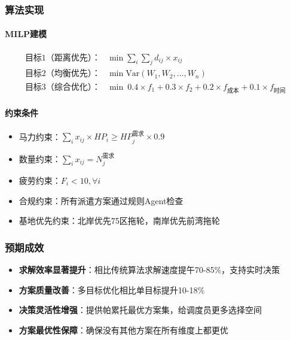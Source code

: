 \documentclass[12pt,a4paper]{article}
\begin{document}
\subsubsection{算法实现}

\paragraph{MILP建模}

\begin{align}
\text{目标1（距离优先）：} & \min \sum_i \sum_j d_{ij} \times x_{ij} \\
\text{目标2（均衡优先）：} & \min \text{Var}(W_1, W_2, \ldots, W_n) \\
\text{目标3（综合优化）：} & \min \ 0.4 \times f_1 + 0.3 \times f_2 + 0.2 \times f_{\text{成本}} + 0.1 \times f_{\text{时间}}
\end{align}

\paragraph{约束条件}

\begin{itemize}[leftmargin=*]
    \item 马力约束：$\sum_i x_{ij} \times HP_i \geq HP_j^{\text{需求}} \times 0.9$
    \item 数量约束：$\sum_i x_{ij} = N_j^{\text{需求}}$
    \item 疲劳约束：$F_i < 10, \forall i$
    \item 合规约束：所有派遣方案通过规则Agent检查
    \item 基地优先约束：北岸优先75区拖轮，南岸优先前湾拖轮
\end{itemize}

\subsubsection{预期成效}

\begin{itemize}[leftmargin=*]
    \item[\checkmark] \textbf{求解效率显著提升}：相比传统算法求解速度提午70-85\%，支持实时决策
    \item[\checkmark] \textbf{方案质量改善}：多目标优化相比单目标提升10-18\%
    \item[\checkmark] \textbf{决策灵活性增强}：提供帕累托最优方案集，给调度员更多选择空间
    \item[\checkmark] \textbf{方案最优性保障}：确保没有其他方案在所有维度上都更优
\end{itemize}
\end{document}
